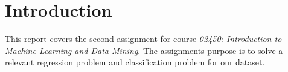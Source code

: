 \section{Introduction}
\label{sec:intro}

This report covers the second assignment for course \textit{02450: Introduction to Machine Learning and Data Mining}. The assignments purpose is to solve a relevant regression problem and classification problem for our dataset.
